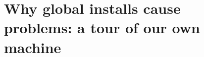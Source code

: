 \chapter{Why global installs cause problems: a tour of our own machine}
\label{ch:why-global-installs-cause-problems-a}

